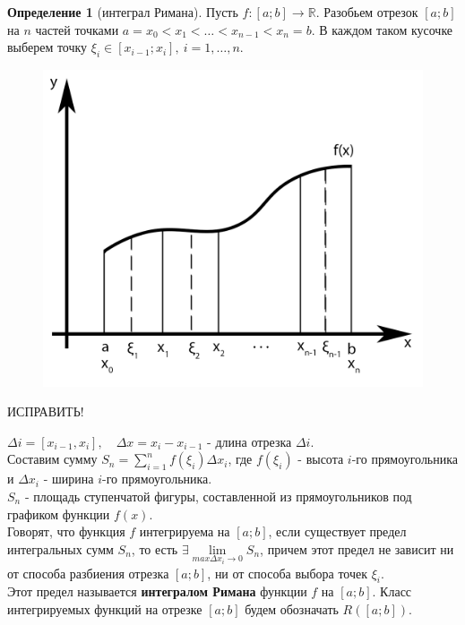 \documentclass{report}
\theoremstyle{definition}
\newtheorem{definition}{Определение}[section]
\begin{document}
\begin{definition}[интеграл Римана]
  Пусть $f:[a;b]\rightarrow\mathbb{R}$. Разобьем отрезок $[a;b]$ на $n$ частей точками $a = x_{0} < x_{1} < \ldots <
    x_{n-1} < x_{n} = b$. В каждом таком кусочке выберем точку $\xi_{i} \in [x_{i-1};x_{i}], \ i = 1,\ldots ,n$.\\

  \begin{figure}[H]
    \begin{center}
      \includegraphics[scale=0.5]{graphic.png}\label{figure1}
    \end{center}
  \end{figure}

  {\Huge ИСПРАВИТЬ!}

  $\Delta i = [x_{i-1}, x_{i}], \quad \Delta x = x_{i} - x_{i-1}$ - длина отрезка $\Delta i$.\\

  Составим сумму $S_{n} = \sum_{i=1}^{n} f(\xi_{i})\Delta x_{i}$, где $f(\xi_{i})$ - высота $i$-го прямоугольника и
  $\Delta x_{i}$ - ширина $i$-го прямоугольника.\\

  $S_{n}$ - площадь ступенчатой фигуры, составленной из прямоугольников под графиком функции $f(x)$.\\

  Говорят, что функция $f$ интегрируема на $[a;b]$, если существует предел интегральных сумм $S_{n}$, то есть
  $\exists \underset{max\Delta x_{i}\rightarrow0}{\lim}S_{n}$, причем этот предел не зависит ни от способа разбиения
  отрезка $[a;b]$, ни от способа выбора точек $\xi_{i}$.\\

  Этот предел называется \textbf{интегралом Римана} функции $f$ на $[a;b]$. Класс интегрируемых функций на отрезке
  $[a;b]$ будем обозначать $R([a;b])$.
\end{definition}
\end{document}
